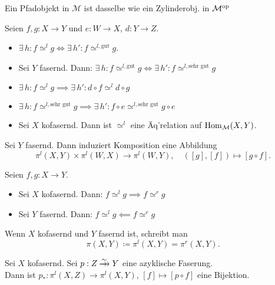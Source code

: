 \documentclass{cheat-sheet}
\newcommand{\nspace}[1]{\foreach \i in {1,...,#1}{ \! }} %
\newcommand{\xtwoheadrightarrow}[1]{\xrightarrow{#1}\nspace{8}\to\,\,} %
\newcommand{\ModC}{\mathcal{M}} %
\newcommand{\gut}{\text{gut}}
\newcommand{\sg}{\text{sehr gut}}
\begin{document}
\begin{bem}
  Ein Pfadobjekt in $\ModC$ ist dasselbe wie ein Zylinderobj. in $\ModC^\op$
\end{bem}


\begin{lem}
  Seien $f, g : X \to Y$ und $e : W \to X$, $d : Y \to Z$.
  \begin{itemize}
    \item $\exists \, h : f \simeq^l g \iff \exists \, h' : f \simeq^{l,\gut} g$.
    \item Sei $Y$ fasernd. Dann: $\exists \, h : f \simeq^{l,\gut} g \iff \exists \, h' : f \simeq^{l,\sg} g$
    \item $\exists \, h : f \simeq^l g \implies \exists \, h' : d \circ f \simeq^l d \circ g$
    \item $\exists \, h : f \simeq^{l,\sg} g \implies \exists \, h' : f \circ e \simeq^{l,\sg} g \circ e$
    \item Sei $X$ kofasernd. Dann ist $\simeq^l$ eine Äq'relation auf $\Hom_\ModC(X, Y)$.
  \end{itemize}
\end{lem}

\begin{kor}
  Sei $Y$ fasernd. Dann induziert Komposition eine Abbildung
  \[
    \pi^l(X, Y) \times \pi^l(W, X) \to \pi^l(W, Y), \quad
    ([g], [f]) \mapsto [g \circ f].
  \]
\end{kor}

\begin{prop}
  Seien $f, g : X \to Y$.
  \begin{itemize}
    \item Sei $X$ kofasernd. Dann: $f \simeq^l g \implies f \simeq^r g$
    \item Sei $Y$ fasernd.\phantom{ko} Dann: $f \simeq^l g \impliedby f \simeq^r g$
  \end{itemize}
\end{prop}

\begin{nota}
  Wenn $X$ kofasernd und $Y$ fasernd ist, schreibt man
  \[ \pi(X, Y) \coloneqq \pi^l(X, Y) = \pi^r(X, Y). \]
\end{nota}

\begin{thm}
  Sei $X$ kofasernd. Sei $p : Z \xtwoheadrightarrow{\sim} Y$ eine azyklische Faserung. \\
  Dann ist $p_* : \pi^l(X, Z) \to \pi^l(X, Y), \, [f] \mapsto [p \circ f]$ eine Bijektion.
\end{thm}
\end{document}
